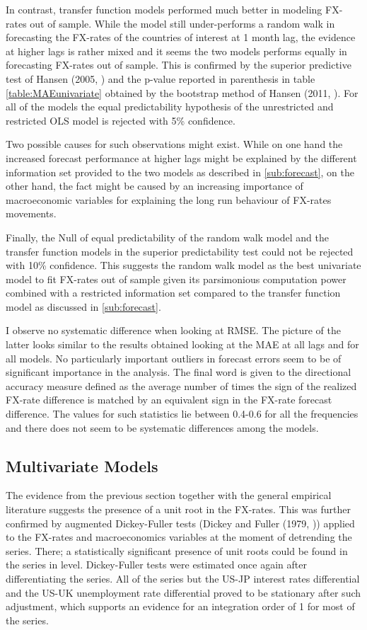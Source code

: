 In contrast, transfer function models performed much better in
modeling FX-rates out of sample. While the model still under-performs a
random walk in forecasting the FX-rates of the countries of interest
at 1 month lag, the evidence at higher lags is rather mixed and it
seems the two models performs equally in forecasting FX-rates out of
sample. This is confirmed by the superior predictive test of Hansen
(2005, \cite{HansenSPA}) and the p-value reported in parenthesis in
table \ref{table:MAEunivariate} obtained by the bootstrap method of
Hansen (2011, \cite{HansenMCS}).  For all of the models the equal
predictability hypothesis of the unrestricted and restricted OLS model
is rejected with 5\% confidence.

Two possible causes for such observations might exist. While on one
hand the increased forecast performance at higher lags might be
explained by the different information set provided to the two models
as described in \ref{sub:forecast}, on the other hand, the fact might
be caused by an increasing importance of macroeconomic variables for
explaining the long run behaviour of FX-rates movements.

Finally, the Null of equal predictability of the random walk model and
the transfer function models in the superior predictability test could
not be rejected with 10\% confidence. This suggests the random walk
model as the best univariate model to fit FX-rates out of sample given
its parsimonious computation power combined with a restricted
information set compared to the transfer function model as discussed
in \ref{sub:forecast}.

I observe no systematic difference when looking at RMSE. The picture
of the latter looks similar to the results obtained looking at the MAE
at all lags and for all models. No particularly important outliers in
forecast errors seem to be of significant importance in the analysis.
The final word is given to the directional accuracy measure defined as
the average number of times the sign of the realized FX-rate
difference is matched by an equivalent sign in the FX-rate forecast
difference. The values for such statistics lie between 0.4-0.6 for all
the frequencies and there does not seem to be systematic differences
among the models. 

\subsection{Multivariate Models}

The evidence from the previous section together with the general
empirical literature suggests the presence of a unit root in the
FX-rates. This was further confirmed by augmented Dickey-Fuller tests
(Dickey and Fuller (1979, \cite{DickeyFuller})) applied to the
FX-rates and macroeconomics variables at the moment of detrending the
series. There; a statistically significant presence of unit roots could
be found in the series in level.  Dickey-Fuller tests were estimated
once again after differentiating the series. All of the series but the
US-JP interest rates differential and the US-UK unemployment rate
differential proved to be stationary after such adjustment, which
supports an evidence for an integration order of 1 for most of the
series.


